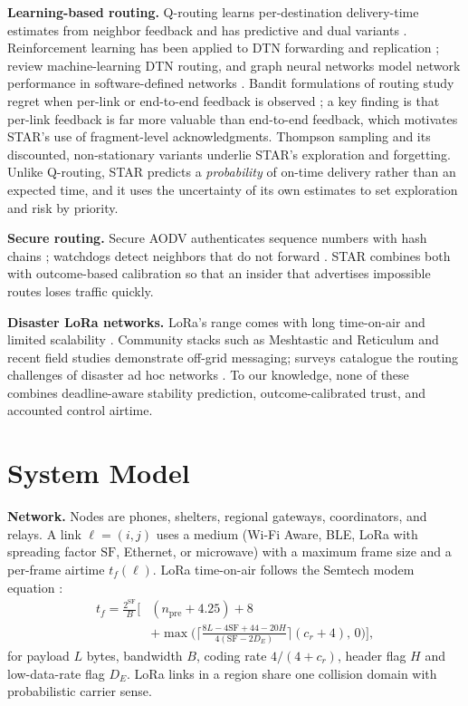 \documentclass[jou,a4paper,11pt,floatsintext]{apa7}
\begin{document}
\textbf{Learning-based routing.} Q-routing learns per-destination delivery-time estimates from neighbor feedback \parencite{boyan1994} and has predictive and dual variants \parencite{choi1996,kumar1997}. Reinforcement learning has been applied to DTN forwarding and replication \parencite{rolla2013,dudukovich2017}; \textcite{bhavani2023} review machine-learning DTN routing, and graph neural networks model network performance in software-defined networks \parencite{rusek2020}. Bandit formulations of routing study regret when per-link or end-to-end feedback is observed \parencite{gai2012,talebi2018}; a key finding is that per-link feedback is far more valuable than end-to-end feedback, which motivates STAR's use of fragment-level acknowledgments. Thompson sampling \parencite{thompson1933,russo2018} and its discounted, non-stationary variants \parencite{raj2017,garivier2011,lattimore2020} underlie STAR's exploration and forgetting. Unlike Q-routing, STAR predicts a \emph{probability} of on-time delivery rather than an expected time, and it uses the uncertainty of its own estimates to set exploration and risk by priority.

\textbf{Secure routing.} Secure AODV authenticates sequence numbers with hash chains \parencite{zapata2002}; watchdogs detect neighbors that do not forward \parencite{marti2000}. STAR combines both with outcome-based calibration so that an insider that advertises impossible routes loses traffic quickly.

\textbf{Disaster LoRa networks.} LoRa's range comes with long time-on-air and limited scalability \parencite{augustin2016,bor2016,adelantado2017}. Community stacks such as Meshtastic and Reticulum \parencite{meshtastic,reticulum} and recent field studies \parencite{khamaisi2025} demonstrate off-grid messaging; surveys catalogue the routing challenges of disaster ad hoc networks \parencite{reina2015}. To our knowledge, none of these combines deadline-aware stability prediction, outcome-calibrated trust, and accounted control airtime.

\section{System Model}
\label{sec:system}

\textbf{Network.} Nodes are phones, shelters, regional gateways, coordinators, and relays. A link $\ell=(i,j)$ uses a medium (Wi-Fi Aware, BLE, LoRa with spreading factor $\mathrm{SF}$, Ethernet, or microwave) with a maximum frame size and a per-frame airtime $t_f(\ell)$. LoRa time-on-air follows the Semtech modem equation \parencite{semtech2013}:
\begin{equation}
\begin{split}
t_f = \frac{2^{\mathrm{SF}}}{B}\Big[&(n_{\mathrm{pre}}+4.25) + 8\\
&+ \max\Big(\Big\lceil\tfrac{8L-4\mathrm{SF}+44-20H}{4(\mathrm{SF}-2D_E)}\Big\rceil(c_r+4),\,0\Big)\Big],
\end{split}
\label{eq:toa}
\end{equation}
for payload $L$ bytes, bandwidth $B$, coding rate $4/(4+c_r)$, header flag $H$ and low-data-rate flag $D_E$. LoRa links in a region share one collision domain with probabilistic carrier sense.
\end{document}
